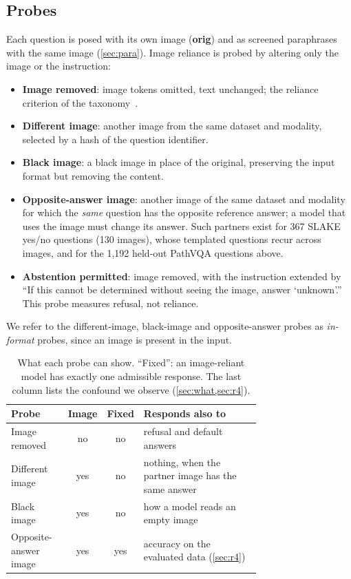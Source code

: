 \documentclass[10pt,twocolumn,letterpaper]{article}
\begin{document}
\subsection{Probes}
\label{sec:probes}
Each question is posed with its own image (\textbf{orig}) and as screened paraphrases with the same image
(\cref{sec:para}). Image reliance is probed by altering only the image or the instruction:
\begin{itemize}[leftmargin=*,nosep]
\item \textbf{Image removed}: image tokens omitted, text unchanged; the reliance criterion of the
taxonomy~\cite{sadanandan2026consistent}.
\item \textbf{Different image}: another image from the same dataset and modality, selected by a hash of the
question identifier.
\item \textbf{Black image}: a black image in place of the original, preserving the input format but removing the
content.
\item \textbf{Opposite-answer image}: another image of the same dataset and modality for which the \emph{same}
question has the opposite reference answer; a model that uses the image must change its answer. Such partners exist
for 367 SLAKE yes/no questions (130 images), whose templated questions recur across images, and for the 1,192
held-out PathVQA questions above.
\item \textbf{Abstention permitted}: image removed, with the instruction extended by ``If this cannot be
determined without seeing the image, answer `unknown'.'' This probe measures refusal, not reliance.
\end{itemize}
We refer to the different-image, black-image and opposite-answer probes as \emph{in-format} probes, since an image
is present in the input.

\begin{table}[t]
\centering\footnotesize\setlength{\tabcolsep}{3pt}
\caption{What each probe can show. ``Fixed'': an image-reliant model has exactly one admissible response. The last
column lists the confound we observe (\cref{sec:what,sec:r4}).}
\label{tab:validity}
\begin{tabular}{@{}p{0.23\linewidth}ccp{0.49\linewidth}@{}}
\toprule
Probe & Image & Fixed & Responds also to\\
\midrule
Image removed & no & no & refusal and default answers\\
Different image & yes & no & nothing, when the partner image has the same answer\\
Black image & yes & no & how a model reads an empty image\\
Opposite-answer image & yes & yes & accuracy on the evaluated data (\cref{sec:r4})\\
\bottomrule
\end{tabular}
\end{table}
\end{document}
